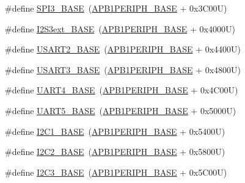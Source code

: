 \begin{DoxyCompactItemize}
\item 
\#define \hyperlink{group___peripheral__memory__map_gae634fe8faa6922690e90fbec2fc86162}{S\+P\+I3\+\_\+\+B\+A\+SE}~(\hyperlink{group___peripheral__memory__map_ga45666d911f39addd4c8c0a0ac3388cfb}{A\+P\+B1\+P\+E\+R\+I\+P\+H\+\_\+\+B\+A\+SE} + 0x3\+C00\+U)
\item 
\#define \hyperlink{group___peripheral__memory__map_ga89b61d6e6b09e94f3fccb7bef34e0263}{I2\+S3ext\+\_\+\+B\+A\+SE}~(\hyperlink{group___peripheral__memory__map_ga45666d911f39addd4c8c0a0ac3388cfb}{A\+P\+B1\+P\+E\+R\+I\+P\+H\+\_\+\+B\+A\+SE} + 0x4000\+U)
\item 
\#define \hyperlink{group___peripheral__memory__map_gade83162a04bca0b15b39018a8e8ec090}{U\+S\+A\+R\+T2\+\_\+\+B\+A\+SE}~(\hyperlink{group___peripheral__memory__map_ga45666d911f39addd4c8c0a0ac3388cfb}{A\+P\+B1\+P\+E\+R\+I\+P\+H\+\_\+\+B\+A\+SE} + 0x4400\+U)
\item 
\#define \hyperlink{group___peripheral__memory__map_gabe0d6539ac0026d598274ee7f45b0251}{U\+S\+A\+R\+T3\+\_\+\+B\+A\+SE}~(\hyperlink{group___peripheral__memory__map_ga45666d911f39addd4c8c0a0ac3388cfb}{A\+P\+B1\+P\+E\+R\+I\+P\+H\+\_\+\+B\+A\+SE} + 0x4800\+U)
\item 
\#define \hyperlink{group___peripheral__memory__map_ga94d92270bf587ccdc3a37a5bb5d20467}{U\+A\+R\+T4\+\_\+\+B\+A\+SE}~(\hyperlink{group___peripheral__memory__map_ga45666d911f39addd4c8c0a0ac3388cfb}{A\+P\+B1\+P\+E\+R\+I\+P\+H\+\_\+\+B\+A\+SE} + 0x4\+C00\+U)
\item 
\#define \hyperlink{group___peripheral__memory__map_gaa155689c0e206e6994951dc3cf31052a}{U\+A\+R\+T5\+\_\+\+B\+A\+SE}~(\hyperlink{group___peripheral__memory__map_ga45666d911f39addd4c8c0a0ac3388cfb}{A\+P\+B1\+P\+E\+R\+I\+P\+H\+\_\+\+B\+A\+SE} + 0x5000\+U)
\item 
\#define \hyperlink{group___peripheral__memory__map_gacd72dbffb1738ca87c838545c4eb85a3}{I2\+C1\+\_\+\+B\+A\+SE}~(\hyperlink{group___peripheral__memory__map_ga45666d911f39addd4c8c0a0ac3388cfb}{A\+P\+B1\+P\+E\+R\+I\+P\+H\+\_\+\+B\+A\+SE} + 0x5400\+U)
\item 
\#define \hyperlink{group___peripheral__memory__map_ga04bda70f25c795fb79f163b633ad4a5d}{I2\+C2\+\_\+\+B\+A\+SE}~(\hyperlink{group___peripheral__memory__map_ga45666d911f39addd4c8c0a0ac3388cfb}{A\+P\+B1\+P\+E\+R\+I\+P\+H\+\_\+\+B\+A\+SE} + 0x5800\+U)
\item 
\#define \hyperlink{group___peripheral__memory__map_ga4e8b9198748235a1729e1e8f8f24983b}{I2\+C3\+\_\+\+B\+A\+SE}~(\hyperlink{group___peripheral__memory__map_ga45666d911f39addd4c8c0a0ac3388cfb}{A\+P\+B1\+P\+E\+R\+I\+P\+H\+\_\+\+B\+A\+SE} + 0x5\+C00\+U)

\end{DoxyCompactItemize}
